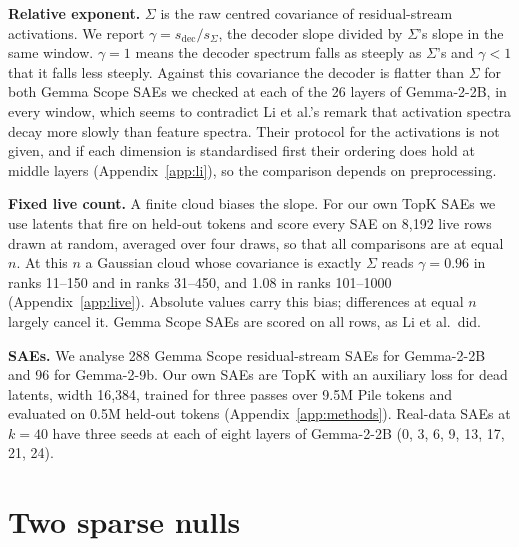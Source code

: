 \documentclass[10pt,twocolumn]{article}
\newcommand{\Sig}{\Sigma}
\begin{document}
\textbf{Relative exponent.} $\Sig$ is the raw centred covariance of residual-stream activations. We report $\gamma = s_{\mathrm{dec}}/s_{\Sig}$, the decoder slope divided by $\Sig$'s slope in the same window. $\gamma=1$ means the decoder spectrum falls as steeply as $\Sig$'s and $\gamma<1$ that it falls less steeply. Against this covariance the decoder is flatter than $\Sig$ for both Gemma Scope SAEs we checked at each of the 26 layers of Gemma-2-2B, in every window, which seems to contradict Li et al.'s remark that activation spectra decay more slowly than feature spectra. Their protocol for the activations is not given, and if each dimension is standardised first their ordering does hold at middle layers (Appendix~\ref{app:li}), so the comparison depends on preprocessing.

\textbf{Fixed live count.} A finite cloud biases the slope. For our own TopK SAEs we use latents that fire on held-out tokens and score every SAE on 8,192 live rows drawn at random, averaged over four draws, so that all comparisons are at equal $n$. At this $n$ a Gaussian cloud whose covariance is exactly $\Sig$ reads $\gamma = 0.96$ in ranks 11--150 and in ranks 31--450, and 1.08 in ranks 101--1000 (Appendix~\ref{app:live}). Absolute values carry this bias; differences at equal $n$ largely cancel it. Gemma Scope SAEs are scored on all rows, as Li et al.\ did.

\textbf{SAEs.} We analyse 288 Gemma Scope residual-stream SAEs for Gemma-2-2B and 96 for Gemma-2-9b. Our own SAEs are TopK with an auxiliary loss for dead latents, width 16,384, trained for three passes over 9.5M Pile tokens and evaluated on 0.5M held-out tokens (Appendix~\ref{app:methods}). Real-data SAEs at $k=40$ have three seeds at each of eight layers of Gemma-2-2B (0, 3, 6, 9, 13, 17, 21, 24).

\section{Two sparse nulls}
\label{sec:nulls}
\end{document}
